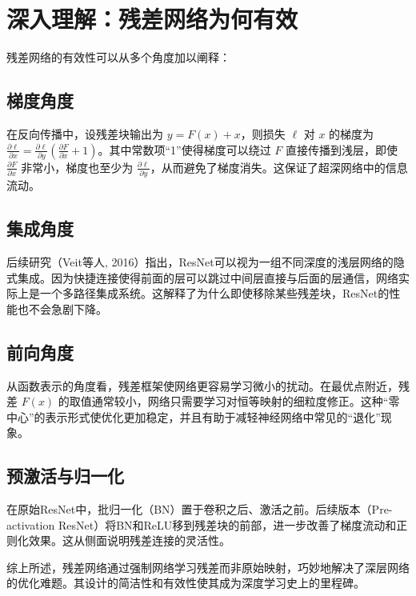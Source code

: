 \section{深入理解：残差网络为何有效}

残差网络的有效性可以从多个角度加以阐释：

\subsection{梯度角度}
在反向传播中，设残差块输出为 $y = F(x) + x$，则损失 $\ell$ 对 $x$ 的梯度为 $\frac{\partial \ell}{\partial x} = \frac{\partial \ell}{\partial y} \left( \frac{\partial F}{\partial x} + 1 \right)$。其中常数项“1”使得梯度可以绕过 $F$ 直接传播到浅层，即使 $\frac{\partial F}{\partial x}$ 非常小，梯度也至少为 $\frac{\partial \ell}{\partial y}$，从而避免了梯度消失。这保证了超深网络中的信息流动。

\subsection{集成角度}
后续研究（Veit等人, 2016）指出，ResNet可以视为一组不同深度的浅层网络的隐式集成。因为快捷连接使得前面的层可以跳过中间层直接与后面的层通信，网络实际上是一个多路径集成系统。这解释了为什么即使移除某些残差块，ResNet的性能也不会急剧下降。

\subsection{前向角度}
从函数表示的角度看，残差框架使网络更容易学习微小的扰动。在最优点附近，残差 $F(x)$ 的取值通常较小，网络只需要学习对恒等映射的细粒度修正。这种“零中心”的表示形式使优化更加稳定，并且有助于减轻神经网络中常见的“退化”现象。

\subsection{预激活与归一化}
在原始ResNet中，批归一化（BN）置于卷积之后、激活之前。后续版本（Pre-activation ResNet）将BN和ReLU移到残差块的前部，进一步改善了梯度流动和正则化效果。这从侧面说明残差连接的灵活性。

综上所述，残差网络通过强制网络学习残差而非原始映射，巧妙地解决了深层网络的优化难题。其设计的简洁性和有效性使其成为深度学习史上的里程碑。